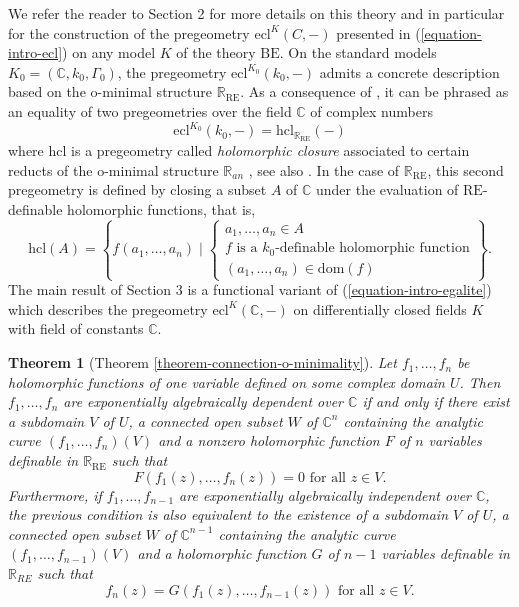 \documentclass[12pt]{amsart}
\newcommand{\BE}{\mathrm{BE}}
\theoremstyle{definition}
\theoremstyle{plain}
\theoremstyle{exampstyle}\newtheorem{thmx}{Theorem}
\theoremstyle{exampstyle}\newtheorem{thmxbis}{Theorem}
\begin{document}
We refer the reader to Section 2 for more details on this theory and in particular for the construction of the pregeometry $\mathrm{ecl}^K(C,-)$ presented in (\ref{equation-intro-ecl})  on any model $K$ of the theory $\BE$. On the standard models $K_0 = (\mathbb{C}, k_0, \Gamma_0)$, the pregeometry  $\mathrm{ecl}^{K_0}(k_0,-)$ admits a concrete description based on the o-minimal structure $\mathbb{R}_{\mathrm{RE}}$.  As a consequence of \cite{Wilkie, Kirby-alg},  it can be phrased as an equality of two pregeometries over the field $\mathbb{C}$ of complex numbers
\begin{equation}\label{equation-intro-egalite}
\mathrm{ecl}^{K_0}(k_0, - ) = \mathrm{hcl}_{\mathbb{R}_{\mathrm{RE}}}(-) 
\end{equation}
where $\mathrm{hcl}$  is a pregeometry called {\em holomorphic closure} associated to certain reducts of the o-minimal structure $\mathbb{R}_{an}$ , see also \cite{Jones-Kirby-Servi, LGKJS}. In the case of $\mathbb{R}_{\mathrm{RE}}$,  this second pregeometry is defined by closing a subset $A$ of $\mathbb{C}$ under the evaluation of $\mathrm{RE}$-definable holomorphic functions, that is,
$$ \mathrm{hcl}(A) = \left\{ f(a_1,\ldots,a_n) \mid \begin{cases} a_1,\ldots, a_n \in A \\ f \text{ is a } k_0\text{-definable  holomorphic function} \\   (a_1,\ldots,a_n) \in \mathrm{dom}(f) \end{cases}\right\}.$$
The main result of Section 3 is a functional variant of (\ref{equation-intro-egalite})  which describes the pregeometry $\mathrm{ecl}^K(\mathbb{C},-)$ on differentially closed fields $K$ with field of constants $\mathbb{C}$.




\begin{thmx}[Theorem \ref{theorem-connection-o-minimality}]
Let $f_1,\ldots,f_n$ be holomorphic functions of one variable defined on some complex domain $U$. Then $f_1,\ldots,f_n$ are exponentially algebraically dependent over $\mathbb{C}$ {\em if and only if} there exist a subdomain $V$ of $U$, a connected open subset $W$ of $\mathbb{C}^n$ containing the analytic curve $(f_1,\ldots,f_n)(V)$ and a nonzero holomorphic function $F$ of $n$ variables definable in $\mathbb{R}_{\mathrm{RE}}$ such that 
$$F(f_1(z),\ldots, f_n(z)) = 0 \text{ for all } z \in V.$$
Furthermore, if $f_1,\ldots,f_{n-1}$ are exponentially algebraically independent over $\mathbb{C}$, the previous condition is also equivalent to the existence of a subdomain $V$ of $U$, a connected open subset $W$ of $\mathbb{C}^{n-1}$ containing the analytic curve $(f_1,\ldots,f_{n-1})(V)$ and a  holomorphic function $G$ of $n-1$ variables definable in $\mathbb{R}_{RE}$ such that
$$ f_n(z) = G(f_1(z),\ldots,f_{n-1}(z)) \text{ for all } z \in V.$$  
\end{thmx} 
 
\end{document}
